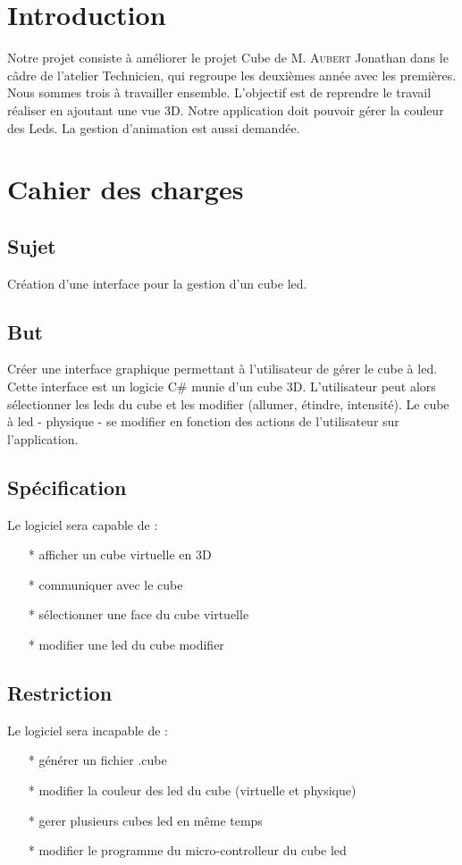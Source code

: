 \documentclass[a4paper,12pt]{article}
\begin{document}
\tableofcontents
\newpage

\section{Introduction}
Notre projet consiste à améliorer le projet Cube de M. \textsc{Aubert} Jonathan dans le câdre de l'atelier Technicien, qui regroupe les deuxièmes année avec les premières. Nous sommes trois à travailler ensemble. L'objectif est de reprendre le travail réaliser en ajoutant une vue 3D. Notre application doit pouvoir gérer la couleur des Leds. La gestion d'animation est aussi demandée.
\newpage

\section{Cahier des charges}
\subsection{Sujet}
Création d'une interface pour la gestion d'un cube led.

\subsection{But}
Créer une interface graphique permettant à l'utilisateur de gérer le cube à led. Cette interface est un logicie C\# munie d'un cube 3D. L'utilisateur peut alors sélectionner les leds du cube et les modifier (allumer, étindre, intensité). Le cube à led - physique - se modifier en fonction des actions de l'utilisateur sur l'application.
\subsection{Spécification}
Le logiciel sera capable de :
\begin{itemize}
	\item[*] afficher un cube virtuelle en 3D
	\item[*] communiquer avec le cube
	\item[*] sélectionner une face du cube virtuelle
	\item[*] modifier une led du cube modifier
\end{itemize}

\subsection{Restriction}
Le logiciel sera incapable de :
\begin{itemize}
	\item[*] générer un fichier .cube
	\item[*] modifier la couleur des led du cube (virtuelle et physique)
	\item[*] gerer plusieurs cubes led en même temps
	\item[*] modifier le programme du micro-controlleur du cube led
\end{itemize}
\end{document}
